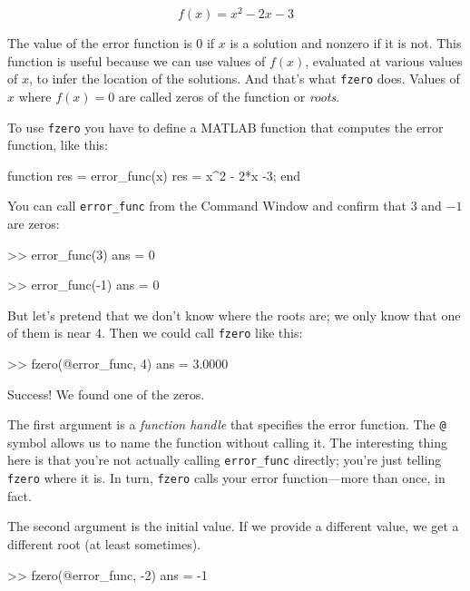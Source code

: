 \begin{equation*}
f(x) = x^2 - 2x -3
\end{equation*}

The value of the error function is 0 if $x$ is a solution and nonzero if it is not.
This function is useful because we can use values of $f(x)$, evaluated at various values of $x$, to infer the location of the solutions.  And that's what \lstinline{fzero} does.
Values of $x$ where $f(x) = 0$ are called zeros of the function or \emph{roots}.


To use \lstinline{fzero} you have to define a MATLAB function that computes the error function, like this:

\begin{code}
function res = error_func(x)
    res = x^2 - 2*x -3;
end
\end{code}

You can call \lstinline{error_func} from the Command Window and confirm that $3$ and $-1$ are zeros:

\begin{code}
>> error_func(3)
ans = 0

>> error_func(-1)
ans = 0
\end{code}

But let's pretend that we don't know where the roots are; we only know that one of them is near 4.  Then we could call \lstinline{fzero} like this:

\begin{code}
>> fzero(@error_func, 4)
ans = 3.0000
\end{code}

Success!  We found one of the zeros.

The first argument is a \emph{function handle} that specifies
the error function.  The \lstinline{@} symbol allows us to name the
function without calling it.  The interesting thing here is
that you're not actually calling \lstinline{error_func} directly;
you're just telling \lstinline{fzero} where it is.  In turn, \lstinline{fzero}
calls your error function---more than once, in fact.


The second argument is the initial value.  If we provide a different
value, we get a different root (at least sometimes).

\begin{code}
>> fzero(@error_func, -2)
ans = -1
\end{code}

